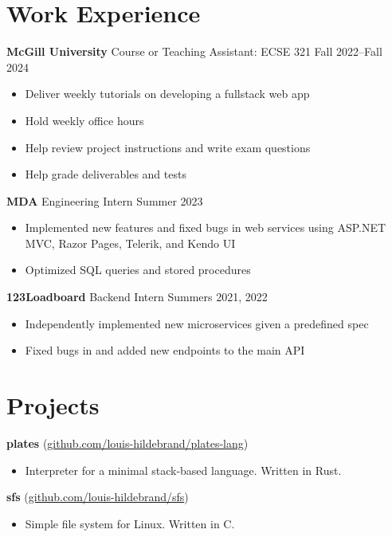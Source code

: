 \documentclass[12pt]{article}
\begin{document}
\section*{Work Experience}

\textbf{McGill University} Course or Teaching Assistant: ECSE 321
\hfill
Fall 2022--Fall 2024
\begin{itemize}
	\item Deliver weekly tutorials on developing a fullstack web app
	\item Hold weekly office hours
	\item Help review project instructions and write exam questions
	\item Help grade deliverables and tests
\end{itemize}

\textbf{MDA} Engineering Intern
\hfill
Summer 2023
\begin{itemize}
	\item Implemented new features and fixed bugs in web services using ASP.NET MVC, Razor Pages, Telerik, and Kendo UI
	\item Optimized SQL queries and stored procedures
\end{itemize}

\textbf{123Loadboard} Backend Intern
\hfill
Summers 2021, 2022
\begin{itemize}
	\item Independently implemented new microservices given a predefined spec
	\item Fixed bugs in and added new endpoints to the main API
\end{itemize}

\section*{Projects}

\textbf{plates} (\href{https://github.com/louis-hildebrand/plates-lang}{github.com/louis-hildebrand/plates-lang})
\begin{itemize}
	\item Interpreter for a minimal stack-based language. Written in Rust.
\end{itemize}

\textbf{sfs} (\href{https://github.com/louis-hildebrand/sfs}{github.com/louis-hildebrand/sfs})
\begin{itemize}
	\item Simple file system for Linux. Written in C.
\end{itemize}
\end{document}
